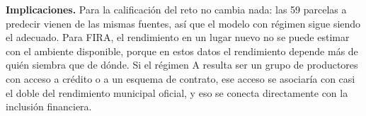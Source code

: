 \textbf{Implicaciones.} Para la calificación del reto no cambia nada: las 59 parcelas a predecir vienen de las mismas
fuentes, así que el modelo con régimen sigue siendo el adecuado. Para FIRA, el rendimiento en un lugar nuevo no se
puede estimar con el ambiente disponible, porque en estos datos el rendimiento depende más de quién siembra que de
dónde. Si el régimen A resulta ser un grupo de productores con acceso a crédito o a un esquema de contrato, ese
acceso se asociaría con casi el doble del rendimiento municipal oficial, y eso se conecta directamente con la
inclusión financiera.
